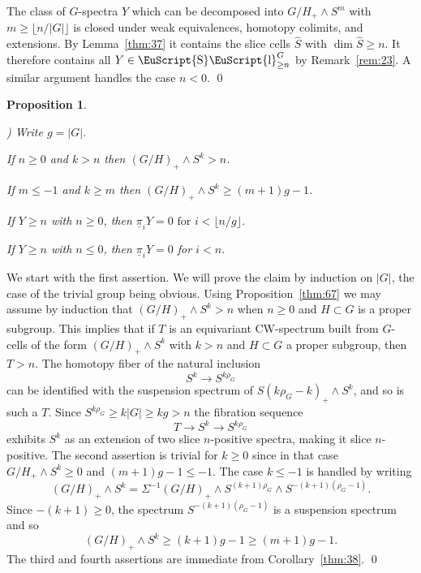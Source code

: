 \documentclass{amsart}
\newtheorem{prop}[equation]{Proposition}
\theoremstyle{definition}
\theoremstyle{remark}
\newenvironment{pf}{\bigskip{\em Proof:\/}}{\qed\medskip}
\newcounter{thmItem}
\newenvironment{thmList}{\begin{list}%
{\rm \roman{thmItem})}{\usecounter{thmItem}
\setlength{\labelwidth}{2em}
\setlength{\itemindent}{2em}
\setlength{\leftmargin}{0pt}
\setlength{\listparindent}{0pt}
\setlength{\parsep}{0pt}
\setlength{\partopsep}{0pt}
\setlength{\itemsep}{\medskipamount}
\setlength{\topsep}{\medskipamount}
}}{\end{list}}
\DeclareMathOperator{\slicesymbol}{\EuScript{S}\EuScript{l}}
\newcommand{\geslice}[1]{\slicesymbol^{G}_{\ge{#1}}}
\newcommand{\pim}{\underline{\pi}}
\newcommand{\slicecell}{\widehat{S}}
\begin{document}
\begin{pf}
The class of $G$-spectra $Y$ which can be decomposed into
$G/H_{+}\wedge S^{m}$ with $m\ge \lfloor n/|G|\rfloor$ is closed under
weak equivalences, homotopy colimits, and extensions.  By
Lemma~\ref{thm:37} it contains the slice cells $\slicecell$ with $\dim
\slicecell\ge n$.  It therefore contains all $Y\in\geslice{n}$ by
Remark~\ref{rem:23}.  A similar argument handles the case $n<0$.
\end{pf}


\begin{prop}\label{thm:40}
\begin{thmList}  Write $g=|G|$.
\item\label{item:1} If $n\ge 0$ and $k>n$ then $(G/H)_{+}\wedge S^{k}
>n$.
\item\label{item:2} If $m\le -1$ and $k\ge m$ then $(G/H)_{+}\wedge
S^{k} \ge (m+1)g-1$.
\item If $Y\ge n$ with $n\ge 0$, then $\pim_{i}Y=0 \text{ for }i <
\lfloor n/g\rfloor$.
\item If $Y \ge n$ with $n\le 0$, then $\pim_{i}Y=0$ for $i<n$.
\end{thmList}
\end{prop}

\begin{pf}
We start with the first assertion.  We will prove the claim by
induction on $|G|$, the case of the trivial group being obvious.
Using Proposition~\ref{thm:67} we may assume by induction that
$(G/H)_{+}\wedge S^{k}> n$ when $n\ge 0$ and $H\subset G$ is a proper
subgroup.  This implies that if $T$ is an equivariant CW-spectrum
built from $G$-cells of the form $(G/H)_{+}\wedge S^{k}$ with $k>n$
and $H\subset G$ a proper subgroup, then $T>n$.  The homotopy fiber of
the natural inclusion
\[
S^{k}\to S^{k\rho_{G}}
\]
can be identified with the suspension spectrum of
$S(k\rho_{G}-k)_{+}\wedge S^{k}$, and so is such a $T$.  Since
$S^{k\rho_{G}}\ge k|G|\ge k g>n$ the fibration sequence
\[
T\to S^{k}\to S^{k\rho_{G}}
\] 
exhibits $S^{k}$ as an extension of two slice $n$-positive spectra,
making it slice $n$-positive.  The second assertion is trivial for
$k\ge 0$ since in that case $G/H_{+}\wedge S^{k}\ge 0$ and
$(m+1)g-1\le -1$.  The case $k\le -1$ is handled by writing
\[
(G/H)_{+}\wedge S^{k} =
\Sigma^{-1}(G/H)_{+}\wedge S^{(k+1)\rho_{G}}\wedge S^{-(k+1)(\rho_{G}-1)}.
\]
Since $-(k+1)\ge 0$, the spectrum $S^{-(k+1)(\rho_{G}-1)}$ is a suspension spectrum
and so
\[
(G/H)_{+}\wedge S^{k} \ge (k+1)g-1 \ge (m+1)g-1.
\]
The third and fourth assertions are immediate from
Corollary~\ref{thm:38}.
\end{pf}
\end{document}
